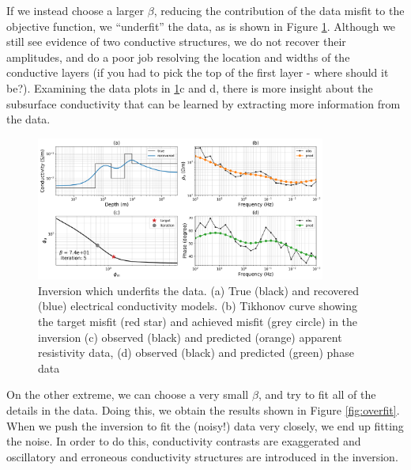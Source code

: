 \documentclass[11pt,oneside]{article}
\begin{document}
If we instead choose a larger $\beta$, reducing the contribution of the data misfit to the objective function, we ``underfit'' the data, as is shown in Figure \ref{fig:underfit}. Although we still see evidence of two conductive structures, we do not recover their amplitudes, and do a poor job resolving the location and widths of the conductive layers (if you had to pick the top of the first layer - where should it be?). Examining the data plots in \ref{fig:underfit}c and d, there is more insight about the subsurface conductivity that can be learned by extracting more information from the data.


\begin{figure}[htb!]
    \centering
    \includegraphics[width=0.85\textwidth]{images/underfit.png}
\caption{Inversion which underfits the data. (a) True (black) and recovered (blue) electrical conductivity models. (b) Tikhonov curve showing the target misfit (red star) and achieved misfit (grey circle) in the inversion (c) observed (black) and predicted (orange) apparent resistivity data, (d) observed (black) and predicted (green) phase data}
\label{fig:underfit}
\end{figure}

On the other extreme, we can choose a very small $\beta$, and try to fit all of the details in the data. Doing this, we obtain the results shown in Figure \ref{fig:overfit}. When we push the inversion to fit the (noisy!) data very closely, we end up fitting the noise. In order to do this, conductivity contrasts are exaggerated and oscillatory and erroneous conductivity structures are introduced in the inversion.
\end{document}
